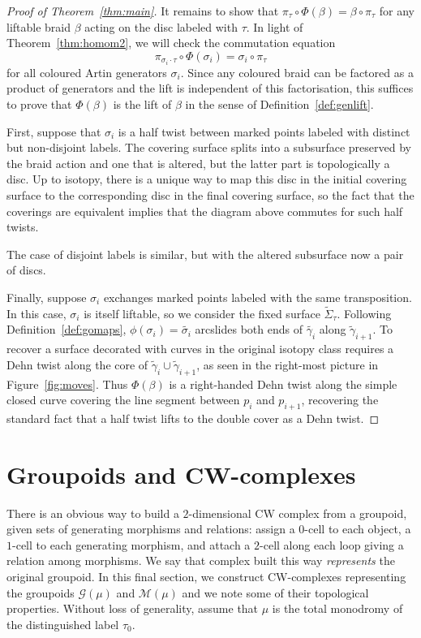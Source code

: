 \documentclass{amsart}
\theoremstyle{definition}
\def\ws{\widetilde{\Sigma}}
\begin{document}
\begin{proof}[Proof of Theorem~\ref{thm:main}]
It remains to show that $\pi_{  \tau} \circ \Phi(\beta)=\beta \circ \pi_\tau$ for any liftable braid $\beta$ acting on the disc labeled with $\tau$. 
In light of Theorem~\ref{thm:homom2}, we will check the commutation equation \[\pi_{\sigma_i \cdot \tau} \circ \Phi(\sigma_i)=\sigma_i \circ \pi_\tau\] for all coloured Artin generators $\sigma_i$.  Since any coloured braid can be factored as a product of generators and the lift is independent of this factorisation, this suffices to prove that $\Phi(\beta)$ is the lift of $\beta$ in the sense of Definition~\ref{def:genlift}.

First, suppose that $\sigma_i$ is a half twist between marked points labeled with distinct but non-disjoint labels.  The covering surface splits into a subsurface preserved by the braid action and one that is altered, but the latter part is topologically a disc.  Up to isotopy, there is a unique way to map this disc in the initial covering surface to the corresponding disc in the final covering surface, so the fact that the coverings are equivalent implies that the diagram above commutes for such half twists.   

The case of disjoint labels is similar, but with the altered subsurface now a pair of discs.  


Finally, suppose $\sigma_i$ exchanges marked points labeled with the same transposition.  In this case, $\sigma_i$ is itself liftable, so we consider the fixed surface $\ws_\tau$.   Following Definition~\ref{def:gomaps}, $\phi(\sigma_i)=\widetilde{\sigma_i}$ arcslides both ends of $\widetilde{\gamma_i}$ along $\widetilde{\gamma}_{i+1}$.  To recover a surface decorated with curves in the original isotopy class requires a Dehn twist along the core of $\widetilde{\gamma}_{i}\cup \widetilde{\gamma}_{i+1}$, as seen in the right-most picture in Figure~\ref{fig:moves}.  Thus $\Phi(\beta)$ is a right-handed Dehn twist along the simple closed curve covering  the line segment between $p_i$ and $p_{i+1}$, recovering the standard fact that a half twist lifts to the double cover as a Dehn twist.


\end{proof}


\section{Groupoids and CW-complexes}

There is an obvious way to build a $2$-dimensional CW complex from a groupoid, given sets of generating morphisms and relations: assign a $0$-cell to each object, a $1$-cell to each generating morphism, and attach a $2$-cell along each loop giving a relation among morphisms.    We say that complex built this way \textit{represents} the original groupoid. In this final section, we construct   CW-complexes representing the groupoids $\mathcal{G}(\mu)$ and $\mathcal{M}(\mu)$ and we note some of their topological properties.  Without loss of generality, assume that $\mu$ is the total monodromy of the distinguished label $\tau_0$.
\end{document}
